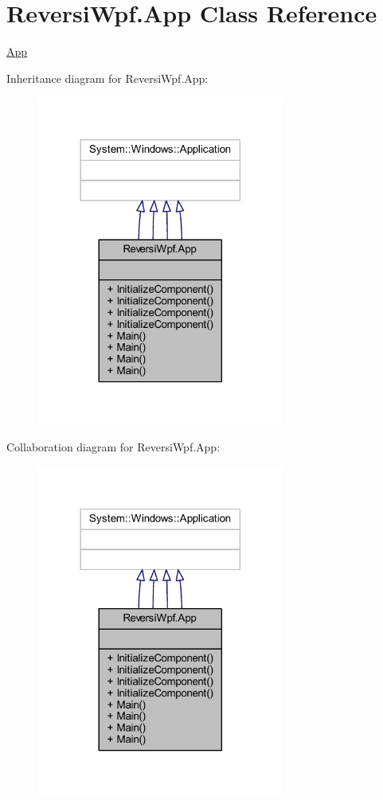 \hypertarget{class_reversi_wpf_1_1_app}{}\section{Reversi\+Wpf.\+App Class Reference}
\label{class_reversi_wpf_1_1_app}


\hyperlink{class_reversi_wpf_1_1_app}{App}  




Inheritance diagram for Reversi\+Wpf.\+App\+:
\nopagebreak
\begin{figure}[H]
\begin{center}
\leavevmode
\includegraphics[width=230pt]{class_reversi_wpf_1_1_app__inherit__graph}
\end{center}
\end{figure}


Collaboration diagram for Reversi\+Wpf.\+App\+:
\nopagebreak
\begin{figure}[H]
\begin{center}
\leavevmode
\includegraphics[width=230pt]{class_reversi_wpf_1_1_app__coll__graph}
\end{center}
\end{figure}
